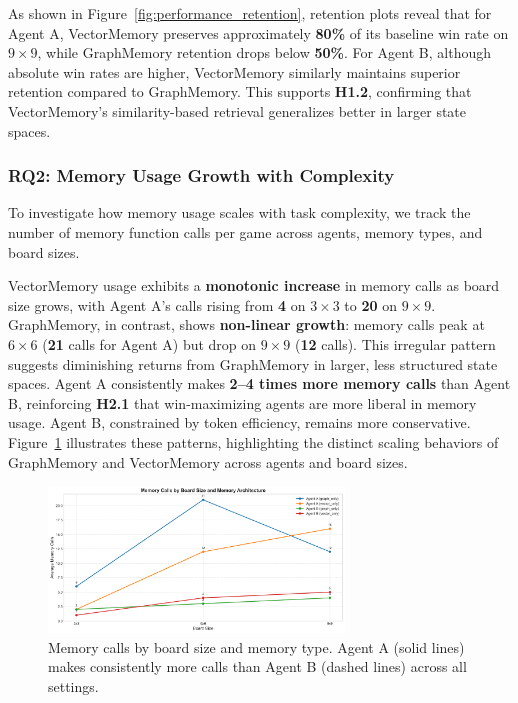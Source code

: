 \documentclass[10pt]{article}
\begin{document}
As shown in Figure~\ref{fig:performance_retention}, retention plots reveal that for Agent A, VectorMemory preserves approximately \textbf{80\%} of its baseline win rate on $9 \times 9$, while GraphMemory retention drops below \textbf{50\%}. For Agent B, although absolute win rates are higher, VectorMemory similarly maintains superior retention compared to GraphMemory. This supports \textbf{H1.2}, confirming that VectorMemory's similarity-based retrieval generalizes better in larger state spaces.

\subsubsection{RQ2: Memory Usage Growth with Complexity}

To investigate how memory usage scales with task complexity, we track the number of memory function calls per game across agents, memory types, and board sizes.

VectorMemory usage exhibits a \textbf{monotonic increase} in memory calls as board size grows, with Agent A's calls rising from \textbf{4} on $3\times3$ to \textbf{20} on $9\times9$. GraphMemory, in contrast, shows \textbf{non-linear growth}: memory calls peak at $6\times6$ (\textbf{21} calls for Agent A) but drop on $9\times9$ (\textbf{12} calls). This irregular pattern suggests diminishing returns from GraphMemory in larger, less structured state spaces. Agent A consistently makes \textbf{2--4 times more memory calls} than Agent B, reinforcing \textbf{H2.1} that win-maximizing agents are more liberal in memory usage. Agent B, constrained by token efficiency, remains more conservative. Figure~\ref{fig:memory_calls} illustrates these patterns, highlighting the distinct scaling behaviors of GraphMemory and VectorMemory across agents and board sizes.

\begin{figure}[ht]
\centering
\includegraphics[width=0.7\textwidth]{figures/memory_calls_by_board_size.png}
\caption{Memory calls by board size and memory type. Agent A (solid lines) makes consistently more calls than Agent B (dashed lines) across all settings.}
\label{fig:memory_calls}
\end{figure}
\end{document}
